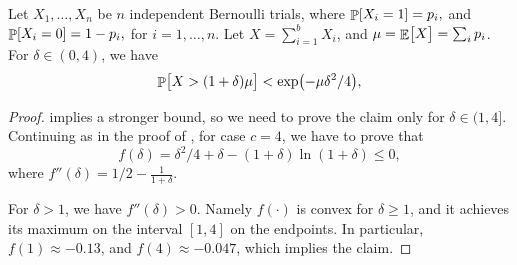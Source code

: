 \begin{fragment}{}
    \begin{lemma}
        Let $X_1, \ldots, X_n$ be $n$ independent Bernoulli trials, where
        \begin{math}
            \Prob{  X_i = 1 } =p_i,
        \end{math}
        and
        \begin{math}
            \Prob{  X_i = 0 } =1- p_i,
        \end{math}
        for $i=1,\ldots, n$.  Let $X = \sum_{i=1}^{b} X_i$, and
        $\mu = \mathop{\mathbb{E}}\!\left[ {\bigl. X} \right] = \sum_i p_i$.  For $\delta \in (0,4)$,
        we have
        \begin{equation*}
            \Prob{ \bigl. X > (1+\delta)\mu } < \exp \pth{-\mu \delta^2 /
               4},
        \end{equation*}
    \end{lemma}
\end{fragment}
\begin{proof}
     implies a stronger bound, so we
    need to prove the claim only for $\delta \in (1,4]$.
    Continuing as in the proof of ,
    for case $c=4$, we have to prove that
    \begin{equation*}
        f(\delta) = \delta^2/4 + \delta -(1+\delta) \ln(1+\delta)
        \leq 0,
    \end{equation*}
    where
    \begin{math}
        f''(\delta) = 1/2 - \frac{1}{1+\delta}.
    \end{math}

    For $\delta > 1$, we have $f''(\delta) > 0$. Namely $f(\cdot)$ is
    convex for $\delta \geq 1$, and it achieves its maximum on the
    interval $[1,4]$ on the endpoints. In particular,
    $f(1)\approx -0.13$, and $f(4) \approx -0.047$, which implies the
    claim.
\end{proof}


